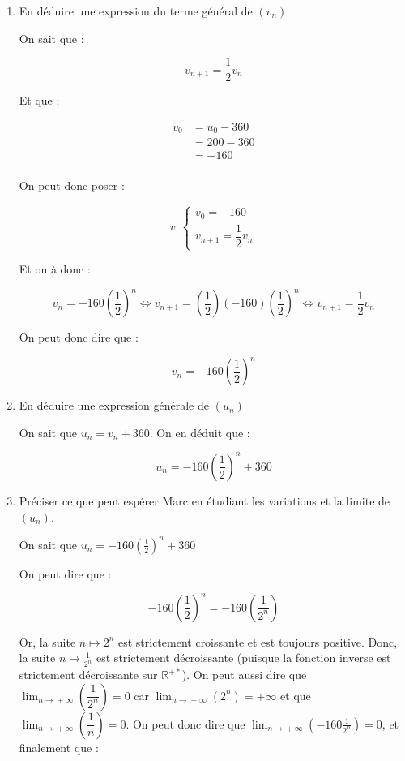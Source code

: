 \documentclass[10pt]{scrartcl}
\begin{document}
\begin{enumerate}[label=\textbf{\arabic*{}.}]
\begin{enumerate}[label=\textbf{\alph*)}]
        \item En déduire une expression du terme général de $(v_n)$

        On sait que :

        $$
            v_{n+1} = \dfrac{1}{2}v_n
        $$

        Et que :

        $$
            \begin{array}{rl}
                v_0 &= u_0 - 360\\
                    &= 200 - 360\\
                    &= -160\\
            \end{array}
        $$

        On peut donc poser :

        $$
            v : \left\{
            \begin{array}{l}
                v_0 = -160\\
                v_{n+1} = \dfrac{1}{2}v_n
            \end{array}
            \right.
        $$

        Et on à donc :

        \[
            v_n = -160\left(\frac{1}{2}\right)^n \iff{} v_{n+1} = \left(\frac{1}{2}\right) (-160)\left(\frac{1}{2}\right)^n \iff{} v_{n+1} = \frac{1}{2} v_n
        \]

        On peut donc dire que :

        \[
            v_n = -160\left(\frac{1}{2}\right)^n
        \]

        \item En déduire une expression générale de $(u_n)$

        On sait que $u_n = v_n + 360$. On en déduit que :

        \[
            u_n = -160\left(\frac{1}{2}\right)^n + 360
        \]

        \item Préciser ce que peut espérer Marc en étudiant les variations et la limite de $(u_n)$.

        On sait que $u_n = -160\left(\frac{1}{2}\right)^n + 360$

        On peut dire que :

        \[
            -160\left(\frac{1}{2}\right)^n = -160\left(\frac{1}{2^n}\right)
        \]

        Or, la suite $n \mapsto{} 2^n$ est strictement croissante et est toujours positive. Donc, la suite $n \mapsto{} \frac{1}{2^n}$ est strictement décroissante (puisque la fonction inverse est strictement décroissante sur $\mathbb{R}^{+*}$). On peut aussi dire que $\displaystyle{}\lim_{n\rightarrow{} +\infty{}}\left(\dfrac{1}{2^n}\right) = 0$ car $\displaystyle{}\lim_{n\rightarrow{}+\infty{}}\left(2^n\right) = +\infty{}$ et que $\displaystyle{}\lim_{n\rightarrow{}+\infty{}}\left(\dfrac{1}{n}\right) = 0$. On peut donc dire que $\displaystyle{}\lim_{n\rightarrow{}+\infty{}}\left(-160\frac{1}{2^n}\right) = 0$, et finalement que : 


\end{enumerate}
\end{enumerate}
\end{document}
